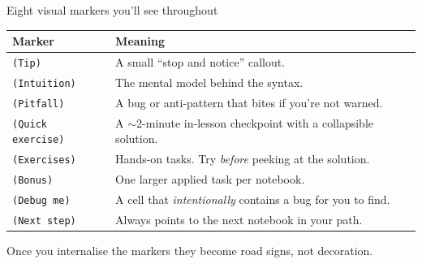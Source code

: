 \documentclass[aspectratio=169,11pt]{beamer}
\begin{document}
\begin{frame}{Eight visual markers you'll see throughout}
  \footnotesize
  \begin{tabular}{ll}
    \toprule
    \textbf{Marker} & \textbf{Meaning} \\
    \midrule
    \texttt{(Tip)}            & A small ``stop and notice'' callout. \\
    \texttt{(Intuition)}      & The mental model behind the syntax. \\
    \texttt{(Pitfall)}        & A bug or anti-pattern that bites if you're not warned. \\
    \texttt{(Quick exercise)} & A $\sim$2-minute in-lesson checkpoint with a collapsible solution. \\
    \texttt{(Exercises)}      & Hands-on tasks. Try \emph{before} peeking at the solution. \\
    \texttt{(Bonus)}          & One larger applied task per notebook. \\
    \texttt{(Debug me)}       & A cell that \emph{intentionally} contains a bug for you to find. \\
    \texttt{(Next step)}      & Always points to the next notebook in your path. \\
    \bottomrule
  \end{tabular}
  \vspace{4pt}

  Once you internalise the markers they become road signs, not decoration.
\end{frame}
\end{document}
